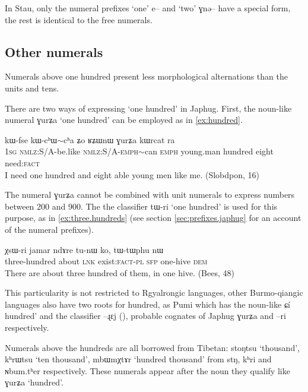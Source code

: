 \documentclass[oldfontcommands,oneside,a4paper,12pt]{article}
\newcommand{\ipa}[1]{{\phon#1}}
\newcommand{\redp}{$\mathtt{\sim}$}
\begin{document}
 
 In Stau, only the numeral prefixes  `one' \ipa{e--} and `two' \ipa{ɣnə--} have a special form, the rest is identical to the free numerals.
 
 \subsection{Other numerals}
Numerals above one hundred present less morphological alternations than the units and tens.
 
 There are two ways of expressing `one hundred' in Japhug. First, the noun-like numeral \ipa{ɣurʑa}   `one hundred' can be employed as in \ref{ex:hundred}.

\begin{exe}
\ex \label{ex:hundred}
\gll \ipa{aʑo} 	\ipa{kɯ-fse} 	\ipa{kɯ-cʰɯ\redp{}cʰa} 	\ipa{ʑo} 	\ipa{ʁʑɯnɯ} 	\ipa{ɣurʑa} 	\ipa{kɯrcat} 	\ipa{ra} \\
\textsc{1sg} \textsc{nmlz}:S/A-be.like  \textsc{nmlz}:S/A-\textsc{emph}\redp{}can \textsc{emph} young.man hundred eight need:\textsc{fact} \\
\glt I need one hundred and eight able young men like me. (Slobdpon, 16)
\end{exe}

The numeral \ipa{ɣurʑa}  cannot be combined with unit numerals to express numbers between 200 and 900. The  the classifier \ipa{tɯ-ri} `one hundred' is used for this purpose, as in \ref{ex:three.hundreds} (see section \ref{sec:prefixes.japhug} for an account of the numeral prefixes).
\begin{exe}
\ex \label{ex:three.hundreds}
\gll
\ipa{χsɯ-ri} 	\ipa{jamar} 	\ipa{ndɤre} 	\ipa{tu-nɯ} 	\ipa{ko,} 	\ipa{tɯ-tɯphu} 	\ipa{nɯ} \\
three-hundred about \textsc{lnk} exist:\textsc{fact-pl} \textsc{sfp} one-hive \textsc{dem} \\
\glt There are about three hundred of them, in one hive. (Bees, 48)
\end{exe}
 
 This particularity is not restricted to Rgyalrongic languages, other Burmo-qiangic languages also have two roots for hundred, as Pumi which has the noun-like \ipa{ɕí}  hundred' and the classifier \ipa{--ɻɛj} (\citealt[101]{daudey14grammar}), probable cognates of Japhug \ipa{ɣurʑa} and \ipa{--ri} respectively.

Numerals above the hundreds are all borrowed from Tibetan: \ipa{stoŋtsu} `thousand', \ipa{kʰrɯtsu} `ten thousand', \ipa{mbɯmχtɤr} `hundred thousand' from \ipa{stŋ}, \ipa{kʰri} and \ipa{ɴbum.tʰer} respectively. These numerals appear after the noun they qualify like \ipa{ɣurʑa} `hundred'.  
 
\end{document}
